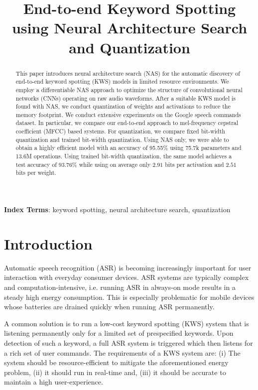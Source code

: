 \documentclass[a4paper]{article}
\title{End-to-end Keyword Spotting using Neural Architecture Search and Quantization}
\begin{document}
\maketitle
\begin{abstract}
This paper introduces neural architecture search (NAS) for the automatic discovery of end-to-end keyword spotting (KWS) models in limited resource environments. We employ a differentiable NAS approach to optimize the structure of convolutional neural networks (CNNs) operating on raw audio waveforms. After a suitable KWS model is found with NAS, we conduct quantization of weights and activations to reduce the memory footprint. We conduct extensive experiments on the Google speech commands dataset. In particular, we compare our end-to-end approach to mel-frequency cepstral coefficient (MFCC) based systems. For quantization, we compare fixed bit-width quantization and trained bit-width quantization. Using NAS only, we were able to obtain a highly efficient model with an accuracy of 95.55\% using 75.7k parameters and 13.6M operations. Using trained bit-width quantization, the same model achieves a test accuracy of 93.76\% while using on average only $2.91$ bits per activation and $2.51$ bits per weight.

\end{abstract}
\noindent\textbf{Index Terms}: keyword spotting, neural architecture search, quantization

\section{Introduction}
Automatic speech recognition (ASR) is becoming increasingly important for user interaction with everyday consumer devices. ASR systems are typically complex and computation-intensive, i.e. running ASR in always-on mode results in a steady high energy consumption. This is especially problematic for mobile devices whose batteries are drained quickly when running ASR permanently. 

A common solution is to run a low-cost keyword spotting (KWS) system that is listening permanently only for a limited set of prespecified keywords. Upon detection of such a keyword, a full ASR system is triggered which then listens for a rich set of user commands. The requirements of a KWS system are: (i) The system should be resource-efficient to mitigate the aforementioned energy problem, (ii) it should run in real-time and, (iii) it should be accurate to maintain a high user-experience.
\end{document}
